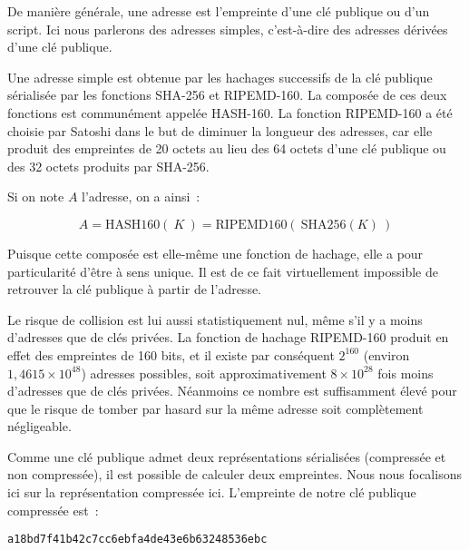 De manière générale, une adresse est l'empreinte d'une clé publique ou d'un script. Ici nous parlerons des adresses simples, c'est-à-dire des adresses dérivées d'une clé publique.

Une adresse simple est obtenue par les hachages successifs de la clé publique sérialisée par les fonctions SHA-256 et RIPEMD-160. La composée de ces deux fonctions est communément appelée HASH-160. La fonction RIPEMD-160 a été choisie par Satoshi dans le but de diminuer la longueur des adresses, car elle produit des empreintes de 20 octets au lieu des 64 octets d'une clé publique ou des 32 octets produits par SHA-256.

Si on note $A$ l'adresse, on a ainsi~:

\[
A = \mathrm{HASH160}(~K~) = \mathrm{RIPEMD160}(~\mathrm{SHA256}( K )~)
\]

Puisque cette composée est elle-même une fonction de hachage, elle a pour particularité d'être à sens unique. Il est de ce fait virtuellement impossible de retrouver la clé publique à partir de l'adresse.

Le risque de collision est lui aussi statistiquement nul, même s'il y a moins d'adresses que de clés privées. La fonction de hachage RIPEMD-160 produit en effet des empreintes de 160 bits, et il existe par conséquent $2^{160}$ (environ $1,4615 \times 10^{48}$) adresses possibles, soit approximativement $8 \times 10^{28}$ fois moins d'adresses que de clés privées. Néanmoins ce nombre est suffisamment élevé pour que le risque de tomber par hasard sur la même adresse soit complètement négligeable.

Comme une clé publique admet deux représentations sérialisées (compressée et non compressée), il est possible de calculer deux empreintes. Nous nous focalisons ici sur la représentation compressée ici. L'empreinte de notre clé publique compressée est~:

\begin{Verbatim}[fontsize=\footnotesize]
a18bd7f41b42c7cc6ebfa4de43e6b63248536ebc
\end{Verbatim}

